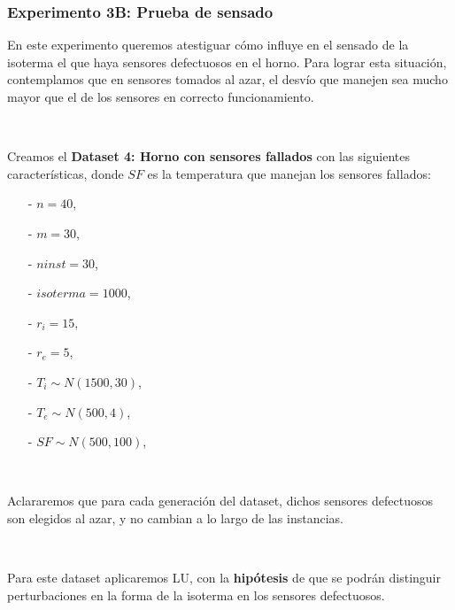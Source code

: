\subsubsection{Experimento 3B: Prueba de sensado}

En este experimento queremos atestiguar cómo influye en el sensado de la isoterma el que haya sensores defectuosos en el horno. Para lograr esta situación, contemplamos que en sensores tomados al azar, el desvío que manejen sea mucho mayor que el de los sensores en correcto funcionamiento.

\

Creamos el \textbf{Dataset 4: Horno con sensores fallados} con las siguientes características, donde $SF$ es la temperatura que manejan los sensores fallados:

\begin{itemize}
    \item[-] $n = 40$,
    \item[-] $m = 30$,
    \item[-] $ninst = 30$,
    \item[-] $isoterma = 1000$,
    \item[-] $r_i = 15$,
    \item[-] $r_e = 5$,
    \item[-] $T_i \sim N(1500, 30)$,
    \item[-] $T_e \sim N(500, 4)$,
    \item[-] $SF \sim N(500, 100)$,
\end{itemize}

\

Aclararemos que para cada generación del dataset, dichos sensores defectuosos son elegidos al azar, y no cambian a lo largo de las instancias. 

\

Para este dataset aplicaremos LU, con la \textbf{hipótesis} de que se podrán distinguir perturbaciones en la forma de la isoterma en los sensores defectuosos.

